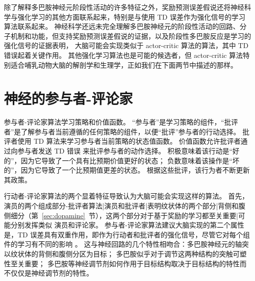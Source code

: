 除了解释多巴胺神经元阶段性活动的许多特征之外，奖励预测误差假说还将神经科学与强化学习的其他方面联系起来，特别是与使用 TD 误差作为强化信号的学习算法联系起来。
神经科学还远未完全理解多巴胺神经元的阶段性活动的回路、分子机制和功能，但支持奖励预测误差假说的证据，以及阶段性多巴胺反应是学习的强化信号的证据表明， 大脑可能会实现类似于 actor-critic 算法的算法，其中 TD 错误起着关键作用。
其他强化学习算法也是可能的候选者，但 actor-critic 算法特别适合哺乳动物大脑的解剖学和生理学，正如我们在下面两节中描述的那样。



\section{神经的参与者-评论家} \label{sec:neural_ac}

参与者-评论家算法学习策略和价值函数。
“参与者”是学习策略的组件，“批评者”是了解参与者当前遵循的任何策略的组件，以便“批评”参与者的行动选择。
批评者使用 TD 算法来学习参与者当前策略的状态值函数。
价值函数允许批评者通过向参与者发送 TD 错误 来批评参与者的动作选择。
积极意味着该行动是“好的”，因为它导致了一个具有比预期价值更好的状态；
负数意味着该操作是“坏的”，因为它导致了一个比预期值更差的状态。
根据这些批评，该行为者不断更新其政策。


行动者-评论家算法的两个显着特征导致认为大脑可能会实现这样的算法。
首先，演员的两个组成部分-批评者算法|演员和批评者|表明纹状体的两个部分|背侧和腹侧细分（第~\ref{sec:dopamine}~节），这两个部分对于基于奖励的学习都至关重要|可能分别发挥类似 演员和评论家。
参与者-评论家算法建议大脑实现的第二个属性是，TD 误差具有双重作用，即作为行动者和批评者的强化信号，尽管它对每个组件的学习有不同的影响 。
这与神经回路的几个特性相吻合：多巴胺神经元的轴突以纹状体的背侧和腹侧分区为目标；
多巴胺似乎对于调节这两种结构的突触可塑性至关重要；
多巴胺等神经调节剂如何作用于目标结构取决于目标结构的特性而不仅仅是神经调节剂的特性。


